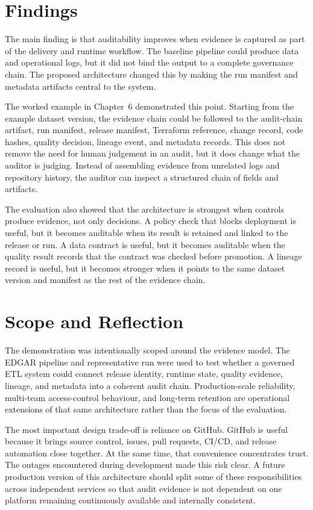 \section{Findings}
\noindent
The main finding is that auditability improves when evidence is captured as
part of the delivery and runtime workflow. The baseline pipeline could produce
data and operational logs, but it did not bind the output to a complete
governance chain. The proposed architecture changed this by making the run
manifest and metadata artifacts central to the system.

The worked example in Chapter~6 demonstrated this point. Starting from the
example dataset version, the evidence chain could be followed to the
audit-chain artifact, run manifest, release manifest, Terraform reference,
change record, code hashes, quality decision, lineage event, and metadata
records. This does not remove the need for human judgement in an audit, but it
does change what the auditor is judging. Instead of assembling evidence from
unrelated logs and repository history, the auditor can inspect a structured
chain of fields and artifacts.

The evaluation also showed that the architecture is strongest when controls
produce evidence, not only decisions. A policy check that blocks deployment is
useful, but it becomes auditable when its result is retained and linked to the
release or run. A data contract is useful, but it becomes auditable when the
quality result records that the contract was checked before promotion. A
lineage record is useful, but it becomes stronger when it points to the same
dataset version and manifest as the rest of the evidence chain.

\section{Scope and Reflection}
\noindent
The demonstration was intentionally scoped around the evidence model. The EDGAR
pipeline and representative run were used to test whether a governed ETL system
could connect release identity, runtime state, quality evidence, lineage, and
metadata into a coherent audit chain. Production-scale reliability, multi-team
access-control behaviour, and long-term retention are operational extensions of
that same architecture rather than the focus of the evaluation.

The most important design trade-off is reliance on GitHub. GitHub is useful
because it brings source control, issues, pull requests, CI/CD, and release
automation close together. At the same time, that convenience concentrates
trust. The outages encountered during development made this risk clear. A
future production version of this architecture should split some of these
responsibilities across independent services so that audit evidence is not
dependent on one platform remaining continuously available and internally
consistent.

